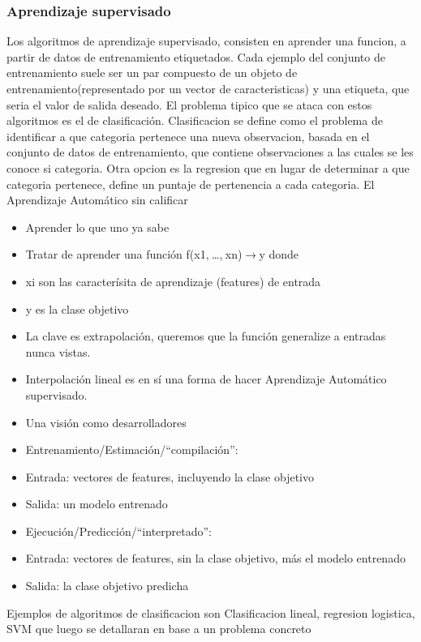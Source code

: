 \documentclass[a4paper,10pt]{article}
\begin{document}
\subsubsection{Aprendizaje supervisado}
Los algoritmos de aprendizaje supervisado, consisten en aprender una funcion, a partir de datos de entrenamiento etiquetados. Cada ejemplo del conjunto de entrenamiento suele ser un par
compuesto de un objeto de entrenamiento(representado por un vector de caracteristicas) y una etiqueta, que seria el valor de salida deseado.
El problema tipico que se ataca con estos algoritmos es el de clasificación. Clasificacion se define como el problema de identificar a que categoria pertenece una nueva observacion,
basada en el conjunto de datos de entrenamiento, que contiene observaciones a las cuales se les conoce si categoria.
Otra opcion es la regresion que en lugar de determinar a que categoria pertenece, define un puntaje de pertenencia a cada categoria.
El Aprendizaje Automático sin calificar
  \begin{itemize}
    \item Aprender lo que uno ya sabe
    \item Tratar de aprender una función f(x1, …, xn) → y donde
    \item xi son las caracterísita de aprendizaje (features) de entrada
    \item y es la clase objetivo
    \item La clave es extrapolación, queremos que la función generalize a entradas nunca vistas.
    \item Interpolación lineal es en sí una forma de hacer Aprendizaje Automático supervisado.
    \item Una visión como desarrolladores
    \item Entrenamiento/Estimación/“compilación”:
    \item Entrada: vectores de features, incluyendo la clase objetivo
    \item Salida: un modelo entrenado
    \item Ejecución/Predicción/“interpretado”:
    \item Entrada: vectores de features, sin la clase objetivo, más el modelo entrenado
    \item Salida: la clase objetivo predicha
  \end{itemize}

Ejemplos de algoritmos de clasificacion son Clasificacion lineal, regresion logistica, SVM que luego se detallaran en base a un problema concreto
\end{document}
